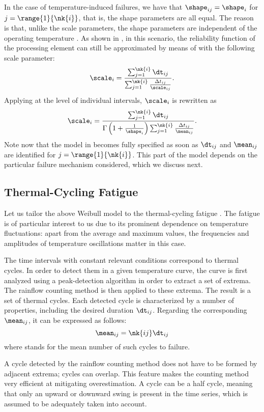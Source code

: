 In the case of temperature-induced failures, we have that $\shape_{ij} =
\shape_i$ for $j = \range{1}{\nk{i}}$, that is, the shape parameters are all
equal. The reason is that, unlike the scale parameters, the shape parameters are
independent of the operating temperature \cite{chang2006}. As shown in
\cite{xiang2010}, in this scenario, the reliability function of the processing
element can still be approximated by means of  with
the following scale parameter:
\[
  \scale_i = \frac{\sum_{j = 1}^{\nk{i}} \dt_{ij}}{\sum_{j = 1}^{\nk{i}} \frac{\Delta t_{ij}}{\scale_{ij}}}.
\]
Applying  at the level of individual intervals,
$\scale_i$ is rewritten as
\[
  \scale_i = \frac{\sum_{j = 1}^{\nk{i}} \dt_{ij}}{\Gamma\left(1 + \frac{1}{\shape_i}\right) \sum_{j = 1}^{\nk{i}} \frac{\Delta t_{ij}}{\mean_{ij}}}.
\]
Note now that the model in  becomes fully specified as
soon as $\dt_{ij}$ and $\mean_{ij}$ are identified for $j = \range{1}{\nk{i}}$.
This part of the model depends on the particular failure mechanism considered,
which we discuss next.

\subsection{Thermal-Cycling Fatigue}

Let us tailor the above Weibull model to the thermal-cycling fatigue
\cite{jedec2016}. The fatigue is of particular interest to us due to its
prominent dependence on temperature fluctuations: apart from the average and
maximum values, the frequencies and amplitudes of temperature oscillations
matter in this case.

The time intervals with constant relevant conditions correspond to thermal
cycles. In order to detect them in a given temperature curve, the curve is first
analyzed using a peak-detection algorithm in order to extract a set of extrema.
The rainflow counting method \cite{xiang2010} is then applied to these extrema.
The result is a set of  thermal cycles. Each detected cycle is
characterized by a number of properties, including the desired duration
$\dt_{ij}$. Regarding the corresponding $\mean_{ij}$, it can be expressed as
follows:
\[
  \mean_{ij} = \nk{ij} \dt_{ij}
\]
where  stands for the mean number of such cycles to failure.

\begin{remark}
A cycle detected by the rainflow counting method does not have to be formed by
adjacent extrema; cycles can overlap. This feature makes the counting method
very efficient at mitigating overestimation. A cycle can be a half cycle,
meaning that only an upward or downward swing is present in the time series,
which is assumed to be adequately taken into account.
\end{remark}

